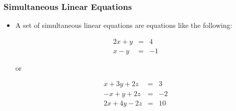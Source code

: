 \documentclass{beamer}
\begin{document}
\begin{frame}
  \frametitle{Simultaneous Linear Equations}

\begin{itemize}

\item A set of simultaneous linear equations are equations like the following:


\begin{eqnarray*}
2x  +   y   &=&   4 \\
x   -   y   &=&   -1
\end{eqnarray*}

or
 
\begin{eqnarray*}
x + 3y+ 2z & = & 3\\
-x + y + 2z & = & -2\\
2x + 4y -2z & = & 10
\end{eqnarray*}


\end{itemize}








\end{frame}
\end{document}
